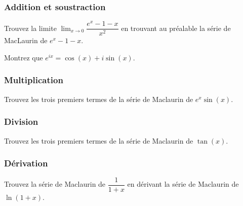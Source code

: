 \documentclass[]{book}
\theoremstyle{definition}
\theoremstyle{definition}
\theoremstyle{definition}
\theoremstyle{remark}
\let\BeginKnitrBlock\begin \let\EndKnitrBlock\end
\begin{document}
\hypertarget{addition-et-soustraction}{%
\subsubsection{Addition et
soustraction}\label{addition-et-soustraction}}

\BeginKnitrBlock{example}
\protect\hypertarget{exm:unnamed-chunk-27}{}{\label{exm:unnamed-chunk-27}
}Trouvez la limite \(\lim_{x\to 0} \dfrac{e^x-1-x}{x^2}\) en trouvant au
préalable la série de MacLaurin de \(e^x-1-x\).
\EndKnitrBlock{example}
\vspace*{10cm}

\BeginKnitrBlock{example}
\protect\hypertarget{exm:unnamed-chunk-28}{}{\label{exm:unnamed-chunk-28}
}Montrez que \(e^{ix}=\cos(x)+i\sin(x)\).
\EndKnitrBlock{example}
\vspace*{10cm}

\hypertarget{multiplication}{%
\subsubsection{Multiplication}\label{multiplication}}

\BeginKnitrBlock{example}
\protect\hypertarget{exm:unnamed-chunk-29}{}{\label{exm:unnamed-chunk-29}
}Trouvez les trois premiers termes de la série de Maclaurin de
\(e^x\sin(x)\).
\EndKnitrBlock{example}
\vspace*{10cm}

\hypertarget{division}{%
\subsubsection{Division}\label{division}}

\BeginKnitrBlock{example}
\protect\hypertarget{exm:unnamed-chunk-30}{}{\label{exm:unnamed-chunk-30}
}Trouvez les trois premiers termes de la série de Maclaurin de
\(\tan(x)\).
\EndKnitrBlock{example}
\vspace*{10cm}

\hypertarget{derivation}{%
\subsubsection{Dérivation}\label{derivation}}

\BeginKnitrBlock{example}
\protect\hypertarget{exm:unnamed-chunk-31}{}{\label{exm:unnamed-chunk-31}
}Trouvez la série de Maclaurin de \(\dfrac{1}{1+x}\) en dérivant la
série de Maclaurin de \(\ln(1+x)\).
\EndKnitrBlock{example}
\vspace*{10cm}
\end{document}
